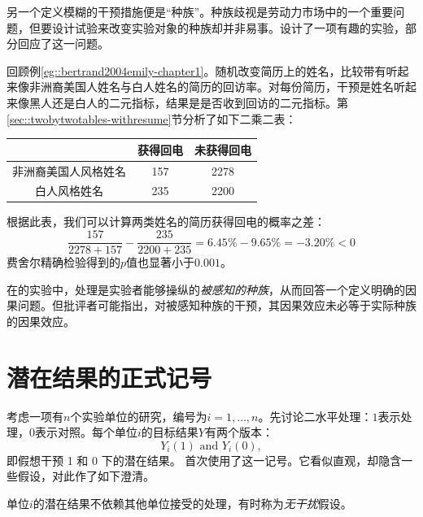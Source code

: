  

另一个定义模糊的干预措施便是“种族”。种族歧视是劳动力市场中的一个重要问题，但要设计试验来改变实验对象的种族却并非易事。\citet{bertrand2004emily}设计了一项有趣的实验，部分回应了这一问题。 

\begin{example}\label{eg::race}
回顾例\ref{eg::bertrand2004emily-chapter1}。\citet{bertrand2004emily}随机改变简历上的姓名，比较带有听起来像非洲裔美国人姓名与白人姓名的简历的回访率。对每份简历，干预是姓名听起来像黑人还是白人的二元指标，结果是是否收到回访的二元指标。第\ref{sec::twobytwotables-withresume}节分析了如下二乘二表： 

\begin{center} 
\begin{tabular}{ccc}
\hline 
 &   获得回电 & 未获得回电 \\
 \hline 
非洲裔美国人风格姓名  & 157 & 2278\\
白人风格姓名   & 235 & 2200\\
\hline 
\end{tabular}
\end{center}

根据此表，我们可以计算两类姓名的简历获得回电的概率之差：
$$
\frac{157}{2278 + 157} - \frac{235}{  2200 + 235 } = 6.45\% - 9.65\% = - 3.20\% < 0
$$
费舍尔精确检验得到的$p$值也显著小于$0.001$。 
\end{example}

在\citet{bertrand2004emily}的实验中，处理是实验者能够操纵的{\it 被感知的种族}，从而回答一个定义明确的因果问题。但批评者可能指出，对被感知种族的干预，其因果效应未必等于实际种族的因果效应。 



\section{潜在结果的正式记号}
\label{sec::po-sciencetable}

考虑一项有$n$个实验单位的研究，编号为$i= 1, \ldots, n$。先讨论二水平处理：$1$表示处理，$0$表示对照。每个单位$i$的目标结果$Y$有两个版本：
$$
Y_i(1)  \text{ and } Y_i(0),
$$
即假想干预 1 和 0 下的潜在结果。 
\citet{Neyman:1923}首次使用了这一记号。它看似直观，却隐含一些假设，\citet{Rubin:1980}对此作了如下澄清。

\begin{assumption}
[无相互干扰]
\label{sutva1}
单位$i$的潜在结果不依赖其他单位接受的处理，有时称为{\it 无干扰}假设。 
\end{assumption}


